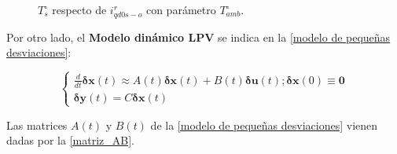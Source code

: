 \documentclass[a4paper, 10pt, onecolumn,journal]{ieeeconf}
\begin{document}
\begin{figure}[thpb]
    \centering
    \begin{adjustbox}{scale = 0.6}
    \end{adjustbox}
    \caption{$T^{\circ}_s$ respecto de $i^r_{qd0s-o}$ con parámetro $T^{\circ}_{amb}$.}
    \label{grafica T_s respecto a la corriente}
\end{figure}

Por otro lado, el \textbf{Modelo dinámico LPV} se indica en la \cref{modelo de pequeñas desviaciones}:

\begin{equation}
    \begin{cases}
        \frac{d}{dt} \mathbf{\delta x}(t) \approx A(t) \mathbf{\delta x}(t) + B(t) \mathbf{\delta u}(t); \mathbf{\delta x}(0) \equiv \mathbf{0}\\
        \mathbf{\delta y}(t) = C\mathbf{\delta x}(t)
    \end{cases}
    \label{modelo de pequeñas desviaciones}
\end{equation}

Las matrices $A(t)$ y $B(t)$ de la \cref{modelo de pequeñas desviaciones} vienen dadas por la \cref{matriz_AB}.
\end{document}
